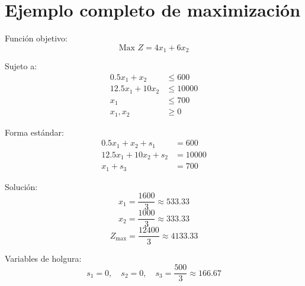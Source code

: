 \documentclass[12pt,letterpaper]{article}
\begin{document}
\section*{Ejemplo completo de maximización}

Función objetivo:
\[ \text{Max } Z = 4x_1 + 6x_2 \]

Sujeto a:
\[
\begin{aligned}
0.5x_1 + x_2 &\leq 600\\
12.5x_1 + 10x_2 &\leq 10000\\
x_1 &\leq 700\\
x_1, x_2 &\geq 0
\end{aligned}
\]

Forma estándar:
\[
\begin{aligned}
0.5x_1 + x_2 + s_1 &= 600\\
12.5x_1 + 10x_2 + s_2 &= 10000\\
x_1 + s_3 &= 700
\end{aligned}
\]

Solución:
\[ x_1 = \frac{1600}{3} \approx 533.33 \]
\[ x_2 = \frac{1000}{3} \approx 333.33 \]
\[ Z_{\max} = \frac{12400}{3} \approx 4133.33 \]

Variables de holgura:
\[ s_1 = 0, \quad s_2 = 0, \quad s_3 = \frac{500}{3} \approx 166.67 \]
\end{document}

